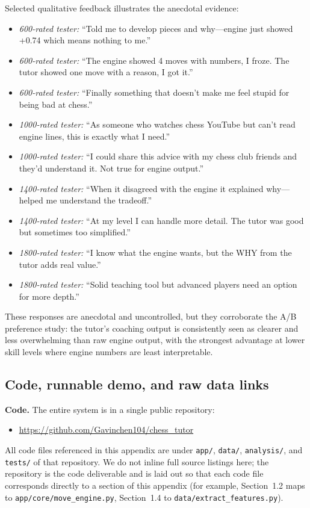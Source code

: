 \documentclass[11pt]{article}
\begin{document}
Selected qualitative feedback illustrates the anecdotal evidence:
\begin{itemize}[leftmargin=*,topsep=2pt,itemsep=1pt]
\item \emph{600-rated tester:} ``Told me to develop pieces and why---engine just showed +0.74 which means nothing to me.''
\item \emph{600-rated tester:} ``The engine showed 4 moves with numbers, I froze. The tutor showed one move with a reason, I got it.''
\item \emph{600-rated tester:} ``Finally something that doesn't make me feel stupid for being bad at chess.''
\item \emph{1000-rated tester:} ``As someone who watches chess YouTube but can't read engine lines, this is exactly what I need.''
\item \emph{1000-rated tester:} ``I could share this advice with my chess club friends and they'd understand it. Not true for engine output.''
\item \emph{1400-rated tester:} ``When it disagreed with the engine it explained why---helped me understand the tradeoff.''
\item \emph{1400-rated tester:} ``At my level I can handle more detail. The tutor was good but sometimes too simplified.''
\item \emph{1800-rated tester:} ``I know what the engine wants, but the WHY from the tutor adds real value.''
\item \emph{1800-rated tester:} ``Solid teaching tool but advanced players need an option for more depth.''
\end{itemize}

These responses are anecdotal and uncontrolled, but they corroborate the A/B preference study: the tutor's coaching output is consistently seen as clearer and less overwhelming than raw engine output, with the strongest advantage at lower skill levels where engine numbers are least interpretable.

\subsection{Code, runnable demo, and raw data links}
\textbf{Code.} The entire system is in a single public repository:
\begin{itemize}[leftmargin=*,topsep=0pt,itemsep=1pt]
\item \url{https://github.com/Gavinchen104/chess_tutor}
\end{itemize}
All code files referenced in this appendix are under \texttt{app/}, \texttt{data/}, \texttt{analysis/}, and \texttt{tests/} of that repository. We do not inline full source listings here; the repository is the code deliverable and is laid out so that each code file corresponds directly to a section of this appendix (for example, Section~1.2 maps to \texttt{app/core/move\_engine.py}, Section~1.4 to \texttt{data/extract\_features.py}).
\end{document}
